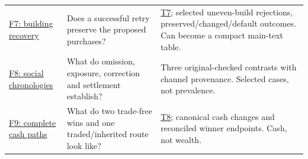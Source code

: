 \begin{longtable}{L{\dimexpr\linewidth/3-2\tabcolsep\relax}L{\dimexpr\linewidth/3-2\tabcolsep\relax}L{\dimexpr\linewidth/3-2\tabcolsep\relax}}
\hyperref[fig:f07_build_recovery]{F7: building recovery} & Does a successful retry preserve the proposed purchases? & \hyperref[tab:t07_build_recovery]{T7}; selected uneven-build rejections, preserved/changed/default outcomes. Can become a compact main-text table. \\
\hyperref[fig:f08_social_chronology]{F8: social chronologies} & What do omission, exposure, correction and settlement establish? & Three original-checked contrasts with channel provenance. Selected cases, not prevalence. \\
\hyperref[fig:f09_cash_trajectories]{F9: complete cash paths} & What do two trade-free wins and one traded/inherited route look like? & \hyperref[tab:t08_cash_trajectories]{T8}; canonical cash changes and reconciled winner endpoints. Cash, not wealth. \\
\bottomrule
\end{longtable}
\endgroup
